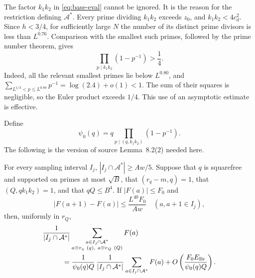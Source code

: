 The factor \(k_1k_2\) in \eqref{eq:base-eval} cannot be ignored.  It is
the reason for the restriction defining \(\mathcal A^*\).  Every prime
dividing \(k_1k_2\) exceeds \(z_0\), and
\(k_1k_2<4c_d^2\).  Since \(h<3/4\), for sufficiently large \(N\)
the number of its distinct prime divisors is less than \(L^{0.76}\).
Comparison with the smallest such primes, followed by the prime number
theorem, gives
\begin{equation}\label{eq:coprime-density}
 \prod_{p\mid k_1k_2}(1-p^{-1})>\frac14.
\end{equation}
Indeed, all the relevant smallest primes lie below \(L^{0.80}\), and
\(\sum_{L^{1/3}<p\le L^{0.80}}p^{-1}=\log(2.4)+o(1)<1\).
The sum of their squares is negligible, so the Euler product exceeds
\(1/4\).  This use of an asymptotic estimate is effective.

Define
\[
 \psi_0(q)=q\prod_{p\mid(q,k_1k_2)}(1-p^{-1}).
\]
The following is the version of source Lemma~8.2(2) needed here.

\begin{lemma}\label{lem:brun}
For every sampling interval \(I_j\),
\(|I_j\cap\mathcal A^*|\ge Aw/5\).  Suppose that \(q\) is squarefree
and supported on primes at most \(\sqrt B\), that
\((r_q-m,q)=1\), that \((Q,qk_1k_2)=1\), and that \(qQ\le B^4\).
If \(|F(a)|\le F_0\) and
\[
 |F(a+1)-F(a)|\le \frac{L^{40}F_0}{Aw}
 \quad(a,a+1\in I_j),
\]
then, uniformly in \(r_Q\),
\begin{align*}
 &\frac1{|I_j\cap\mathcal A^*|}
 \sum_{\substack{a\in I_j\cap\mathcal A^*\\
      a\equiv r_q\ (q),\ a\equiv r_Q\ (Q)}}F(a)\\
 &\hspace{1cm}=
 \frac1{\psi_0(q)Q}\,
 \frac1{|I_j\cap\mathcal A^*|}
 \sum_{a\in I_j\cap\mathcal A^*}F(a)
 +O\left(\frac{F_0E_{\rm Br}}{\psi_0(q)Q}\right).
\end{align*}
\end{lemma}

